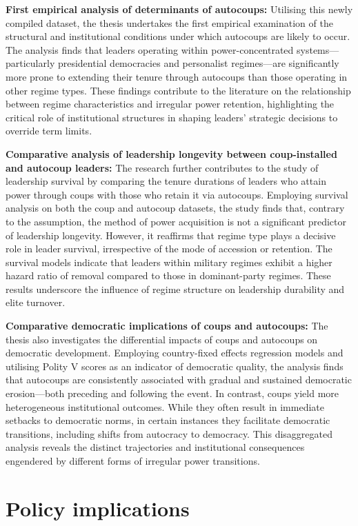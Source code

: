 \documentclass[
  12pt,
]{report}
\begin{document}
\textbf{First empirical analysis of determinants of autocoups:}
Utilising this newly compiled dataset, the thesis undertakes the first
empirical examination of the structural and institutional conditions
under which autocoups are likely to occur. The analysis finds that
leaders operating within power-concentrated systems---particularly
presidential democracies and personalist regimes---are significantly
more prone to extending their tenure through autocoups than those
operating in other regime types. These findings contribute to the
literature on the relationship between regime characteristics and
irregular power retention, highlighting the critical role of
institutional structures in shaping leaders' strategic decisions to
override term limits.

\textbf{Comparative analysis of leadership longevity between
coup-installed and autocoup leaders:} The research further contributes
to the study of leadership survival by comparing the tenure durations of
leaders who attain power through coups with those who retain it via
autocoups. Employing survival analysis on both the coup and autocoup
datasets, the study finds that, contrary to the assumption, the method
of power acquisition is not a significant predictor of leadership
longevity. However, it reaffirms that regime type plays a decisive role
in leader survival, irrespective of the mode of accession or retention.
The survival models indicate that leaders within military regimes
exhibit a higher hazard ratio of removal compared to those in
dominant-party regimes. These results underscore the influence of regime
structure on leadership durability and elite turnover.

\textbf{Comparative democratic implications of coups and autocoups:} The
thesis also investigates the differential impacts of coups and autocoups
on democratic development. Employing country-fixed effects regression
models and utilising Polity V scores as an indicator of democratic
quality, the analysis finds that autocoups are consistently associated
with gradual and sustained democratic erosion---both preceding and
following the event. In contrast, coups yield more heterogeneous
institutional outcomes. While they often result in immediate setbacks to
democratic norms, in certain instances they facilitate democratic
transitions, including shifts from autocracy to democracy. This
disaggregated analysis reveals the distinct trajectories and
institutional consequences engendered by different forms of irregular
power transitions.

\section{Policy implications}\label{policy-implications}
\end{document}
